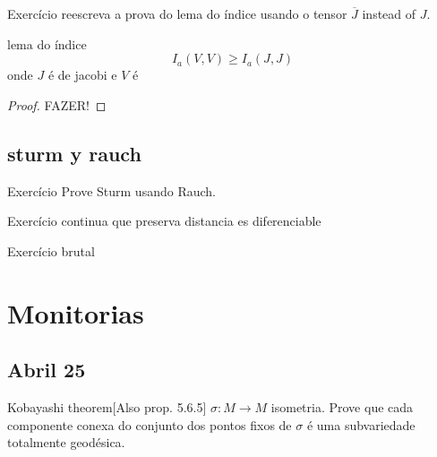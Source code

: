 \begin{thing6}{Exercício }\label{exer:}\leavevmode
reescreva a prova do lema do índice usando o tensor \(\overline{J}\) instead of \(J\).
\end{thing6}

\begin{thing6}{lema do índice}\leavevmode
\[\boxed{I_a(V,V) \geq I_a(J,J)}\]
onde \(J\) é de jacobi e \(V\) é 
\end{thing6}

\begin{proof}\leavevmode
FAZER!
\end{proof}

\subsection{sturm y rauch}

\begin{thing6}{Exercício }\label{exer:}\leavevmode
Prove Sturm usando Rauch.
\end{thing6}

\begin{thing6}{Exercício }\label{exer:}\leavevmode
continua que preserva distancia es diferenciable
\end{thing6}

\begin{thing6}{Exercício brutal}\label{exer:brutal}\leavevmode

\end{thing6}
\section{Monitorias}

\subsection{Abril 25}
\begin{thing6}{Kobayashi theorem}[Also \cite{pet} prop. 5.6.5]\label{exer:}\leavevmode
\(\sigma:M \to M\) isometria.
Prove que cada componente conexa do conjunto dos pontos fixos de \(\sigma\) é uma subvariedade totalmente geodésica.
\end{thing6}

